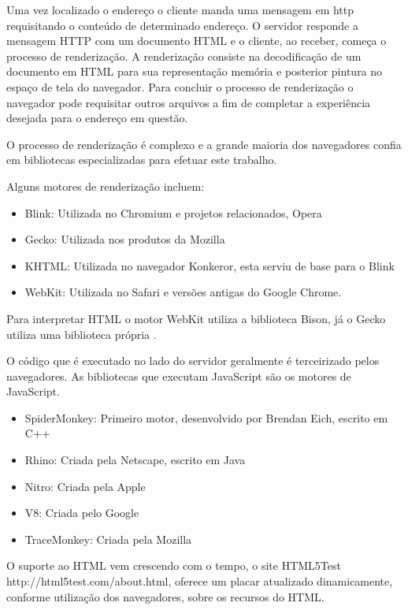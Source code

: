 Uma vez localizado o endereço o cliente manda uma mensagem em http requisitando 
o conteúdo de determinado endereço.
O servidor responde a mensagem HTTP com um documento HTML
 e o cliente, ao receber, começa o processo de renderização. A renderização consiste
na decodificação de um documento em HTML para sua representação
memória e posterior pintura no espaço de tela do navegador. Para
concluir o processo de renderização o navegador pode requisitar outros
arquivos a fim de completar a experiência desejada para o endereço
em questão.

O processo de renderização é complexo e a grande maioria dos navegadores
confia em bibliotecas especializadas para efetuar este trabalho.

Alguns motores de renderização incluem:

\begin{itemize}
    \item Blink: Utilizada no Chromium e projetos relacionados, Opera
    \item Gecko: Utilizada nos produtos da Mozilla
    \item KHTML: Utilizada no navegador Konkeror, esta serviu de base para o Blink
    \item WebKit: Utilizada no Safari e versões antigas do Google Chrome.
\end{itemize}

Para interpretar HTML o motor WebKit utiliza a biblioteca Bison, já o
Gecko utiliza uma biblioteca própria \autocite{howBrowsersWork}.

O código que é executado no lado do servidor geralmente é terceirizado pelos navegadores.
As bibliotecas que executam JavaScript são os motores de JavaScript.

\begin{itemize}
    \item SpiderMonkey: Primeiro motor, desenvolvido por Brendan Eich, escrito em C++
    \item Rhino: Criada pela Netscape, escrito em Java
    \item Nitro: Criada pela Apple
    \item V8: Criada pelo Google
    \item TraceMonkey: Criada pela Mozilla
\end{itemize}

O suporte ao HTML vem crescendo com o tempo, o site HTML5Test
http://html5test.com/about.html, oferece um placar atualizado
dinamicamente, conforme utilização dos navegadores, sobre os recursos
do HTML.

